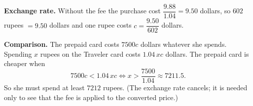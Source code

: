 \textbf{Exchange rate.} Without the fee the purchase cost $\dfrac{9.88}{1.04}=9.50$ dollars, so $602$ rupees $=9.50$ dollars and one rupee costs $c=\dfrac{9.50}{602}$ dollars.

\textbf{Comparison.} The prepaid card costs $7500c$ dollars whatever she spends. Spending $x$ rupees on the Traveler card costs $1.04\,xc$ dollars. The prepaid card is cheaper when
\[7500c<1.04\,xc\iff x>\dfrac{7500}{1.04}\approx7211.5.\]
So she must spend at least $\boxed{7212}$ rupees. (The exchange rate cancels; it is needed only to see that the fee is applied to the converted price.)
